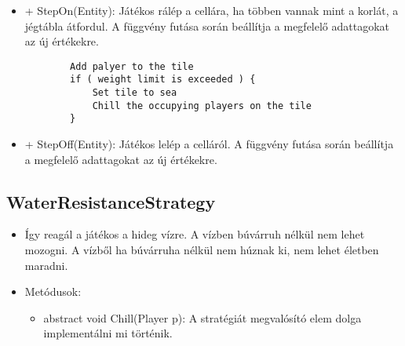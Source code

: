 \begin{itemize}
\begin{itemize}
		\item + StepOn(Entity): Játékos rálép a cellára, ha többen vannak mint a korlát, a jégtábla átfordul. A függvény futása során beállítja a megfelelő adattagokat az új értékekre.
		\begin{lstlisting}
		Add palyer to the tile
		if ( weight limit is exceeded ) {
			Set tile to sea
			Chill the occupying players on the tile
		}
		\end{lstlisting}
		\item + StepOff(Entity): Játékos lelép a celláról. A függvény futása során beállítja a megfelelő adattagokat az új értékekre.
	\end{itemize}
\end{itemize}

\subsection{WaterResistanceStrategy}
\begin{itemize}
	\item Így reagál a játékos a hideg vízre. A vízben búvárruh nélkül nem lehet mozogni. A vízből ha búvárruha nélkül nem húznak ki, nem lehet életben maradni.
	\item Metódusok:
	\begin{itemize}
		\item abstract void Chill(Player p): A stratégiát megvalósító elem dolga implementálni mi történik.
	\end{itemize}
\end{itemize}

